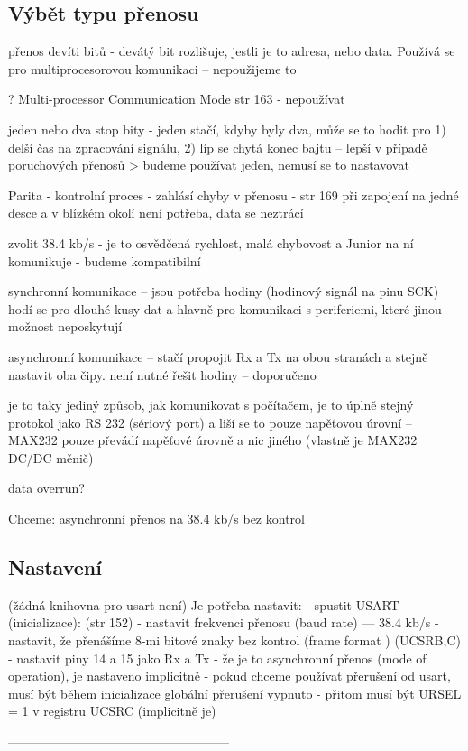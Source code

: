 \subsection{Výbět typu přenosu }


přenos devíti bitů - devátý bit rozlišuje, jestli je to adresa, nebo data. 
Používá se pro multiprocesorovou komunikaci -- nepoužijeme to  

? Multi-processor Communication Mode str 163 - nepoužívat 

jeden nebo dva stop bity - jeden stačí, kdyby byly dva, může se to hodit pro 
1) delší čas na zpracování signálu, 
2) líp se chytá konec bajtu -- lepší v případě poruchových přenosů 
> budeme používat jeden, nemusí se to nastavovat 


 Parita - kontrolní proces - zahlásí chyby v přenosu - str 169 při zapojení na jedné desce a v blízkém okolí není potřeba, data se neztrácí 
 
 zvolit 38.4 kb/s - je to osvědčená rychlost, malá chybovost a Junior na ní komunikuje - budeme kompatibilní 
 
 synchronní komunikace -- jsou potřeba hodiny (hodinový signál na pinu SCK) 
 hodí se pro dlouhé kusy dat a hlavně pro komunikaci s periferiemi, které jinou možnost neposkytují 
 
 asynchronní komunikace -- stačí propojit Rx a Tx na obou stranách a stejně nastavit oba čipy. není nutné řešit hodiny --  doporučeno   
 
 je to taky jediný způsob, jak komunikovat s počítačem, je to úplně stejný protokol jako RS 232 (sériový port) a liší se to pouze napěťovou úrovní -- MAX232 pouze převádí napěťové úrovně a nic jiného (vlastně je MAX232 DC/DC měnič)
 
 data overrun? 
 
Chceme: asynchronní přenos na 38.4 kb/s bez kontrol  


\subsection{Nastavení}

(žádná knihovna pro usart není)
Je potřeba nastavit: 
- spustit USART (inicializace):  (str 152)
   - nastavit frekvenci přenosu (baud rate)  --- 38.4 kb/s 
   - nastavit, že přenášíme 8-mi bitové znaky bez kontrol  (frame format ) (UCSRB,C)
   - nastavit piny 14 a 15 jako Rx a Tx 
   - že je to  asynchronní přenos (mode of operation), je nastaveno implicitně 
   - pokud chceme používat přerušení od usart, musí být během inicializace 
     globální přerušení vypnuto 
   - přitom musí být URSEL = 1 v registru UCSRC (implicitně je)
   
   
  
  -----------------------------------------------------
  
   
 


 
 



 

 

